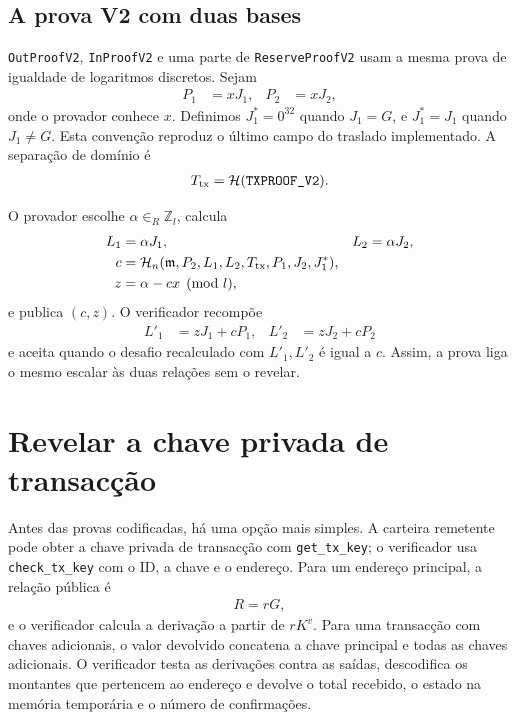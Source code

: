 \subsection{A prova V2 com duas bases}
\label{subsec:proofs-multi-base-monero}

\texttt{OutProofV2}, \texttt{InProofV2} e uma parte de
\texttt{ReserveProofV2} usam a mesma prova de igualdade de logaritmos
discretos. Sejam
\begin{align*}
 P_1&=xJ_1, & P_2&=xJ_2,
\end{align*}
onde o provador conhece \(x\). Definimos \(J_1^*=0^{32}\) quando
\(J_1=G\), e \(J_1^*=J_1\) quando \(J_1\neq G\). Esta convenção reproduz o
último campo do traslado implementado. A separação de domínio é
\begin{align*}
 T_{\rm tx}=\mathcal H(\texttt{TXPROOF\_V2}).
\end{align*}

O provador escolhe \(\alpha\in_R\mathbb Z_l\), calcula
\begin{align*}
 L_1&=\alpha J_1, & L_2&=\alpha J_2,\\
 c&=\mathcal H_n(\mathfrak m,P_2,L_1,L_2,T_{\rm tx},P_1,J_2,J_1^*),\\
 z&=\alpha-cx\pmod l,
\end{align*}
e publica \((c,z)\). O verificador recompõe
\begin{align*}
 L'_1&=zJ_1+cP_1, & L'_2&=zJ_2+cP_2
\end{align*}
e aceita quando o desafio recalculado com \(L'_1,L'_2\) é igual a \(c\).
Assim, a prova liga o mesmo escalar às duas relações sem o revelar.

\section{Revelar a chave privada de transacção}
\label{sec:proofs-transaction-key}

Antes das provas codificadas, há uma opção mais simples. A carteira remetente
pode obter a chave privada de transacção com \texttt{get\_tx\_key}; o
verificador usa \texttt{check\_tx\_key} com o ID, a chave e o endereço. Para um
endereço principal, a relação pública é
\begin{align*}
 R=rG,
\end{align*}
e o verificador calcula a derivação a partir de \(rK^v\). Para uma transacção
com chaves adicionais, o valor devolvido concatena a chave principal e todas
as chaves adicionais. O verificador testa as derivações contra as saídas,
descodifica os montantes que pertencem ao endereço e devolve o total recebido,
o estado na memória temporária e o número de confirmações.

